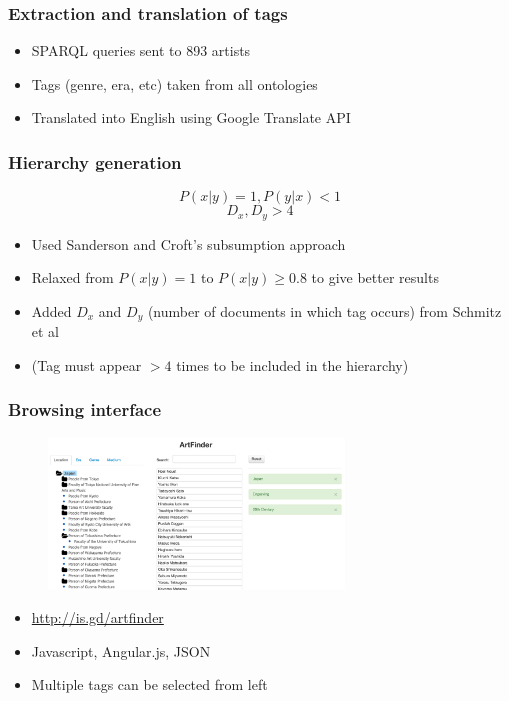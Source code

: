 \documentclass{beamer}
\begin{document}
\begin{frame}
    \frametitle{Extraction and translation of tags}
        \begin{itemize}
          \item SPARQL queries sent to 893 artists
            \item Tags (genre, era, etc) taken from all ontologies
            \item Translated into English using Google Translate API
        \end{itemize}
\end{frame}

\begin{frame}
    \frametitle{Hierarchy generation}
            \[P(x|y) = 1, P(y|x) < 1\]
            \[D_x, D_y > 4\]
        \begin{itemize}
            \item Used Sanderson and Croft's subsumption approach \cite{sanderson}
            \item Relaxed from $P(x|y) = 1$ to $P(x|y) \geq 0.8$ to give better results
            \item Added $D_x$ and $D_y$ (number of documents in which tag occurs) from Schmitz et al \cite{schmitz}
            \item (Tag must appear $> 4$ times to be included in the hierarchy)
        \end{itemize}
\end{frame}


\begin{frame}
    \frametitle{Browsing interface}
    \begin{figure}
        \centering
        \includegraphics[width=0.7\textwidth]{artfinder1.png}
    \end{figure}
        \begin{itemize}
            \item \url{http://is.gd/artfinder}
          \item Javascript, Angular.js, JSON
            \item Multiple tags can be selected from left
        \end{itemize}
\end{frame}
\end{document}

